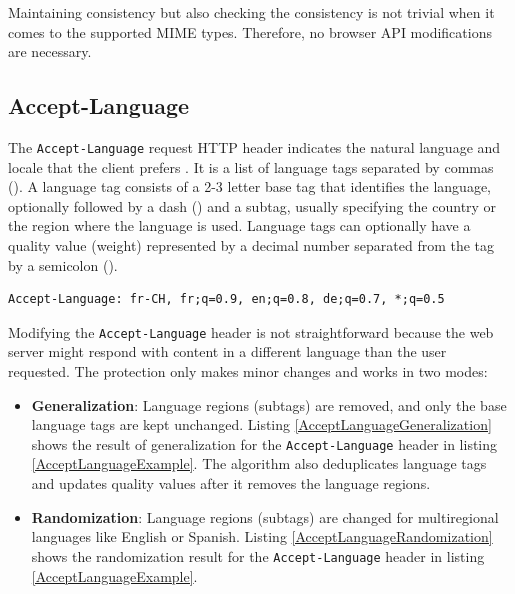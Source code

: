 Maintaining consistency but also checking the consistency is not trivial when it comes to the supported MIME types. Therefore, no browser API modifications are necessary.

\subsection{Accept-Language}
\label{SubSection:AcceptLanguage}

The \texttt{Accept-Language} request HTTP header indicates the natural language and locale that the client prefers \cite{MDN}. It is a list of language tags separated by commas (\uv{,}). A language tag consists of a 2-3 letter base tag that identifies the language, optionally followed by a dash (\uv{-}) and a subtag, usually specifying the country or the region where the language is used. Language tags can optionally have a quality value (weight) represented by a decimal number separated from the tag by a semicolon (\uv{;}).

\bigbreak

\begin{lstlisting}[caption={An example of Accept-Language header contents \cite{MDN}.}, label={AcceptLanguageExample}]
Accept-Language: fr-CH, fr;q=0.9, en;q=0.8, de;q=0.7, *;q=0.5
\end{lstlisting}

\medbreak

Modifying the \texttt{Accept-Language} header is not straightforward because the web server might respond with content in a different language than the user requested. The protection only makes minor changes and works in two modes:

\begin{itemize}
	\item \textbf{Generalization}: Language regions (subtags) are removed, and only the base language tags are kept unchanged. Listing \ref{AcceptLanguageGeneralization} shows the result of generalization for the \texttt{Accept-Language} header in listing \ref{AcceptLanguageExample}. The algorithm also deduplicates language tags and updates quality values after it removes the language regions.
	\item \textbf{Randomization}: Language regions (subtags) are changed for multiregional languages like English or Spanish. Listing \ref{AcceptLanguageRandomization} shows the randomization result for the \texttt{Accept-Language} header in listing \ref{AcceptLanguageExample}.
\end{itemize}

